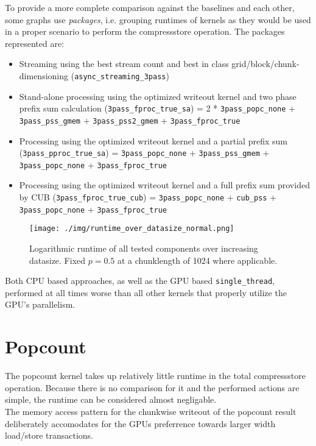 \documentclass{tudscrreprt}
\begin{document}
			To provide a more complete comparison against the baselines and each other, some graphs use \emph{packages}, i.e. grouping runtimes of kernels as they would be used in a proper scenario to perform the compressstore operation. The packages represented are:
			\begin{itemize}
				\item Streaming using the best stream count and best in class grid/block/chunk-dimensioning (\texttt{async\_streaming\_3pass})
				\item Stand-alone processing using the optimized writeout kernel and two phase prefix sum calculation (\texttt{3pass\_fproc\_true\_sa})
					\subitem = 2 * \texttt{3pass\_popc\_none} + \texttt{3pass\_pss\_gmem} + \texttt{3pass\_pss2\_gmem} + \texttt{3pass\_fproc\_true}
				\item Processing using the optimized writeout kernel and a partial prefix sum (\texttt{3pass\_pproc\_true\_sa})
					\subitem = \texttt{3pass\_popc\_none} + \texttt{3pass\_pss\_gmem} + \texttt{3pass\_popc\_none} + \texttt{3pass\_fproc\_true}
				\item Processing using the optimized writeout kernel and a full prefix sum provided by CUB (\texttt{3pass\_fproc\_true\_cub})
					\subitem = \texttt{3pass\_popc\_none} + \texttt{cub\_pss} + \texttt{3pass\_popc\_none} + \texttt{3pass\_fproc\_true}
			\end{itemize}
	
		\begin{figure}[!ht]
			\centering
			\texttt{[image: ./img/runtime\_over\_datasize\_normal.png]}
			\caption{\label{fig:runtime_over_datasize_normal}Logarithmic runtime of all tested components over increasing datasize. Fixed $p=0.5$ at a chunklength of 1024 where applicable.}
		\end{figure}
	
		Both CPU based approaches, as well as the GPU based \texttt{single\_thread}, performed at all times worse than all other kernels that properly utilize the GPU's parallelism. \\
	
		\section{Popcount}
			The popcount kernel takes up relatively little runtime in the total compressstore operation. Because there is no comparison for it and the performed actions are simple, the runtime can be considered almost negligable. \\
			The memory access pattern for the chunkwise writeout of the popcount result deliberately accomodates for the GPUs preferrence towards larger width load/store transactions. \\
			
\end{document}
